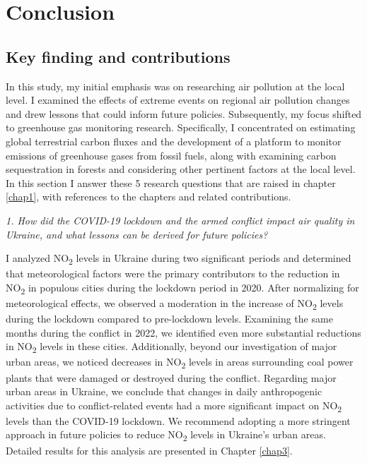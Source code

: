 \chapter{Conclusion} \label{chap8}
\section{Key finding and contributions}
In this study, my initial emphasis was on researching air pollution at the local level. I examined the effects of extreme events on regional air pollution changes and drew lessons that could inform future policies. Subsequently, my focus shifted to greenhouse gas monitoring research. Specifically, I concentrated on estimating global terrestrial carbon fluxes and the development of a platform to monitor emissions of greenhouse gases from fossil fuels, along with examining carbon sequestration in forests and considering other pertinent factors at the local level. In this section I answer these 5 research questions that are raised in chapter \ref{chap1}, with references to the chapters and related contributions. \par

\textit{1. How did the COVID-19 lockdown and the armed conflict impact air quality in Ukraine, and what lessons can be derived for future policies?} \par
I analyzed NO\textsubscript{2} levels in Ukraine during two significant periods and determined that meteorological factors were the primary contributors to the reduction in NO\textsubscript{2} in populous cities during the lockdown period in 2020. After normalizing for meteorological effects, we observed a moderation in the increase of NO\textsubscript{2} levels during the lockdown compared to pre-lockdown levels. Examining the same months during the conflict in 2022, we identified even more substantial reductions in NO\textsubscript{2} levels in these cities. Additionally, beyond our investigation of major urban areas, we noticed decreases in NO\textsubscript{2} levels in areas surrounding coal power plants that were damaged or destroyed during the conflict. Regarding major urban areas in Ukraine, we conclude that changes in daily anthropogenic activities due to conflict-related events had a more significant impact on NO\textsubscript{2} levels than the COVID-19 lockdown. We recommend adopting a more stringent approach in future policies to reduce NO\textsubscript{2} levels in Ukraine's urban areas. Detailed results for this analysis are presented in Chapter \ref{chap3}. \par

